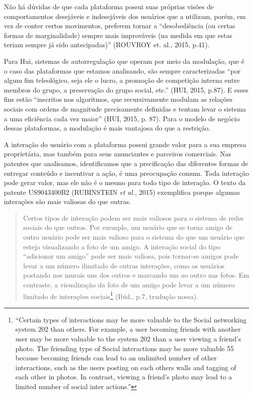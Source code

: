Não há dúvidas de que cada plataforma possui suas próprias visões de
comportamentos desejáveis e indesejáveis dos usuários que a utilizam,
porém, em vez de conter certos movimentos, preferem tornar a
``desobediência (ou certas formas de marginalidade) sempre mais
improváveis (na medida em que estas teriam sempre já sido antecipadas)''
(ROUVROY et. al., 2015, p.41).

Para Hui, sistemas de autorregulação que operam por meio da modulação,
que é o caso das plataformas que estamos analisando, são sempre
caracterizadas ``por algum fim teleológico, seja ele o lucro, a promoção
de competição interna entre membros do grupo, a preservação do grupo
social, etc.'' (HUI, 2015, p.87). E esses fins estão ``inscritos nos
algoritmos, que recursivamente modulam as relações sociais com ordens de
magnitude precisamente definidas e tentam levar o sistema a uma
eficiência cada vez maior'' (HUI, 2015, p. 87). Para o modelo de negócio
dessas plataformas, a modulação é mais vantajosa do que a restrição.

A interação do usuário com a plataforma possui grande valor para a sua
empresa proprietária, mas também para seus anunciantes e parceiros
comerciais. Nas patentes que analisamos, identificamos que a
precificação das diferentes formas de entregar conteúdo e incentivar a
ação, é uma preocupação comum. Toda interação pode gerar valor, mas ele
não é o mesmo para todo tipo de interação. O texto da patente
US9043400B2 (RUBINSTEIN \emph{et al.}, 2015) exemplifica porque algumas
interações são mais valiosas do que outras.

\begin{quote}
Certos tipos de interação podem ser mais valiosos para o sistema de
redes sociais do que outros. Por exemplo, um usuário que se torna amigo
de outro usuário pode ser mais valioso para o sistema do que um usuário
que esteja visualizando a foto de um amigo. A interação social do tipo
``adicionar um amigo'' pode ser mais valiosa, pois tornar-se amigos pode
levar a um número ilimitado de outras interações, como os usuários
postando nos murais uns dos outros e marcando um ao outro nas fotos. Em
contraste, a visualização da foto de um amigo pode levar a um número
limitado de interações sociais\footnote{``Certain types of interactions
  may be more valuable to the Social networking system 202 than others.
  For example, a user becoming friends with another user may be more
  valuable to the system 202 than a user viewing a friend's photo. The
  friending type of Social interactions may be more valuable 55 because
  becoming friends can lead to an unlimited number of other
  interactions, such as the users posting on each others walls and
  tagging of each other in photos. In contrast, viewing a friend's photo
  may lead to a limited number of social inter actions.''} (Ibid., p.7,
tradução nossa).
\end{quote}

